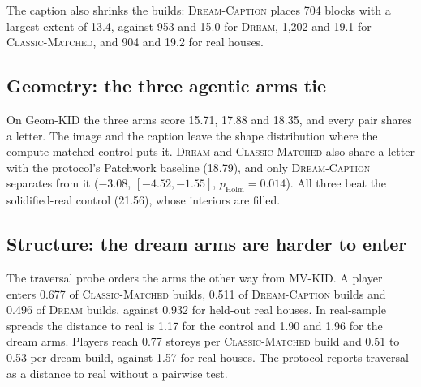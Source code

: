 The caption also shrinks the builds: \textsc{Dream-Caption} places 704 blocks with a largest extent of 13.4, against 953 and 15.0 for \textsc{Dream}, 1{,}202 and 19.1 for \textsc{Classic-Matched}, and 904 and 19.2 for real houses. %

\subsection{Geometry: the three agentic arms tie}

On Geom-KID the three arms score 15.71, 17.88 and 18.35, and every pair shares a letter. %
The image and the caption leave the shape distribution where the compute-matched control puts it.
\textsc{Dream} and \textsc{Classic-Matched} also share a letter with the protocol's Patchwork baseline (18.79), and only \textsc{Dream-Caption} separates from it ($-3.08$, $[-4.52, -1.55]$, $p_{\text{Holm}}{=}0.014$). %
All three beat the solidified-real control (21.56), whose interiors are filled. %

\subsection{Structure: the dream arms are harder to enter}

The traversal probe orders the arms the other way from MV-KID. %
A player enters 0.677 of \textsc{Classic-Matched} builds, 0.511 of \textsc{Dream-Caption} builds and 0.496 of \textsc{Dream} builds, against 0.932 for held-out real houses. %
In real-sample spreads the distance to real is 1.17 for the control and 1.90 and 1.96 for the dream arms. %
Players reach 0.77 storeys per \textsc{Classic-Matched} build and 0.51 to 0.53 per dream build, against 1.57 for real houses. %
The protocol reports traversal as a distance to real without a pairwise test. 

